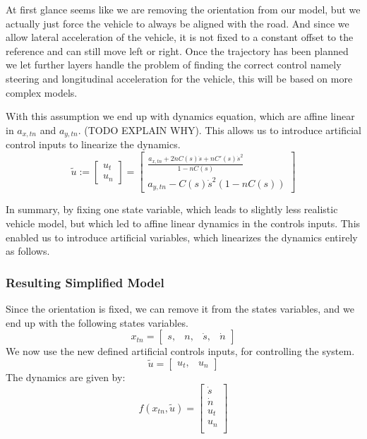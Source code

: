 At first glance seems like we are removing the orientation from our model, but we actually just force the vehicle to always be aligned with the road.
And since we allow lateral acceleration of the vehicle, it is not fixed to a constant offset to the reference and can still move left or right.
Once the trajectory has been planned we let further layers handle the problem of finding the correct control namely steering and longitudinal
acceleration for the vehicle, this will be based on more complex models.

With this assumption we end up with dynamics equation, which are affine linear in $a_{x,tn}$ and $a_{y,tn}$.
(TODO EXPLAIN WHY).
This allows us to introduce artificial control inputs to linearize the dynamics.
\begin{equation}
	\label{def:artificial_controls}
	\tilde{u} := \begin{bmatrix}
		u_t \\
		u_n
	\end{bmatrix} = \begin{bmatrix}
		\frac{
			a_{x,tn} + 2\dot{n}
		C(s)\dot{s} + nC'(s)\dot{s}^2 }{ 1 - nC(s) } \\ a_{y,tn} - C(s)\dot{s}^2(1 - nC(s))\end{bmatrix} \end{equation}

In summary, by
fixing one state variable, which leads to slightly less realistic vehicle model, but which led to affine linear dynamics in the controls inputs.
This enabled us to introduce artificial variables, which linearizes the dynamics entirely as follows.

\subsubsection{Resulting Simplified Model}

Since the orientation is fixed, we can remove it from the states variables, and we end up with the following states variables.
\[
	x_{tn} = \begin{bmatrix} s, & n, & \dot{s}, & \dot{n} \end{bmatrix}
\]
We now use the new defined artificial controls inputs, for controlling the system.
\[
	\tilde{u} = \begin{bmatrix} u_t, & u_n \end{bmatrix}
\]
The dynamics are given by:
\begin{equation}
	f(x_{tn}, \tilde{u}) = \begin{bmatrix}
		\dot{s} \\
		\dot{n} \\
		u_t     \\
		u_n     \\
	\end{bmatrix}
	\label{eq:pm_final_dynamics}
\end{equation}

